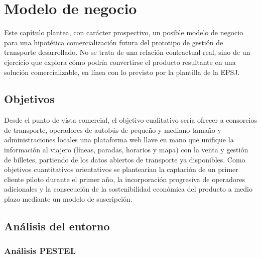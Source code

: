 \chapter{Modelo de negocio}
\label{cap:modelo-negocio}

Este capítulo plantea, con carácter prospectivo, un posible modelo de negocio para una hipotética comercialización futura del prototipo de gestión de transporte desarrollado. No se trata de una relación contractual real, sino de un ejercicio que explora cómo podría convertirse el producto resultante en una solución comercializable, en línea con lo previsto por la plantilla de la EPSJ.


\section{Objetivos}
\label{sec:negocio-objetivos}

Desde el punto de vista comercial, el objetivo cualitativo sería ofrecer a consorcios de transporte, operadores de autobús de pequeño y mediano tamaño y administraciones locales una plataforma web llave en mano que unifique la información al viajero (líneas, paradas, horarios y mapa) con la venta y gestión de billetes, partiendo de los datos abiertos de transporte ya disponibles. Como objetivos cuantitativos orientativos se plantearían la captación de un primer cliente piloto durante el primer año, la incorporación progresiva de operadores adicionales y la consecución de la sostenibilidad económica del producto a medio plazo mediante un modelo de suscripción.


\section{Análisis del entorno}
\label{sec:negocio-entorno}

\subsection{Análisis PESTEL}

